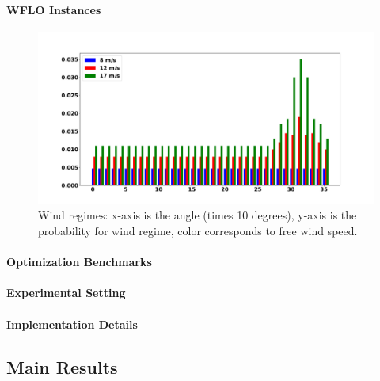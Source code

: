 \documentclass[preprint,12pt]{elsarticle}
\begin{document}
\paragraph{WFLO Instances}
\begin{figure}[t]
	\centering
	\includegraphics[scale = 0.3]{prob_wind_pdf.pdf}
	
	\caption{Wind regimes: x-axis is the angle (times 10 degrees), y-axis is the probability for wind regime, color corresponds to free wind speed.}\label{fig:prob_wind}
\end{figure}

\paragraph{Optimization Benchmarks}

\paragraph{Experimental Setting}

\paragraph{Implementation Details}


\subsection{Main Results}
\end{document}
